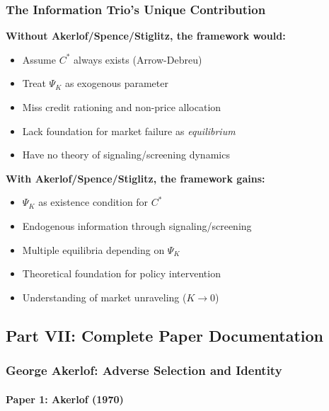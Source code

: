 \subsubsection{The Information Trio's Unique Contribution}

\textbf{Without Akerlof/Spence/Stiglitz, the framework would:}
\begin{itemize}
    \item Assume $C^*$ always exists (Arrow-Debreu)
    \item Treat $\Psi_K$ as exogenous parameter
    \item Miss credit rationing and non-price allocation
    \item Lack foundation for market failure as \textit{equilibrium}
    \item Have no theory of signaling/screening dynamics
\end{itemize}

\textbf{With Akerlof/Spence/Stiglitz, the framework gains:}
\begin{itemize}
    \item $\Psi_K$ as existence condition for $C^*$
    \item Endogenous information through signaling/screening
    \item Multiple equilibria depending on $\Psi_K$
    \item Theoretical foundation for policy intervention
    \item Understanding of market unraveling ($K \to 0$)
\end{itemize}

\subsection{Part VII: Complete Paper Documentation}

\subsubsection{George Akerlof: Adverse Selection and Identity}

\paragraph{Paper 1: Akerlof (1970)}

